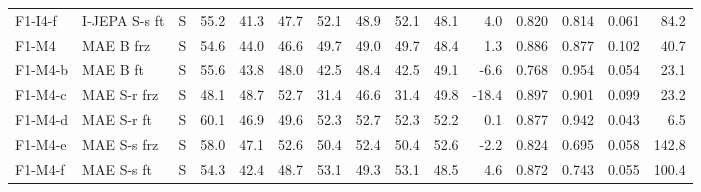 \begin{longtable}{@{}l>{\raggedright\arraybackslash}p{2.2cm}crrrrrrrrrrrr@{}}
F1-I4-f & I-JEPA S-s ft & S & 55.2 & 41.3 & 47.7 & 52.1 & 48.9 & 52.1 & 48.1 & 4.0 & 0.820 & 0.814 & 0.061 & 84.2 \\
F1-M4 & MAE B frz & S & 54.6 & 44.0 & 46.6 & 49.7 & 49.0 & 49.7 & 48.4 & 1.3 & 0.886 & 0.877 & 0.102 & 40.7 \\
F1-M4-b & MAE B ft & S & 55.6 & 43.8 & 48.0 & 42.5 & 48.4 & 42.5 & 49.1 & -6.6 & 0.768 & 0.954 & 0.054 & 23.1 \\
F1-M4-c & MAE S-r frz & S & 48.1 & 48.7 & 52.7 & 31.4 & 46.6 & 31.4 & 49.8 & -18.4 & 0.897 & 0.901 & 0.099 & 23.2 \\
F1-M4-d & MAE S-r ft & S & 60.1 & 46.9 & 49.6 & 52.3 & 52.7 & 52.3 & 52.2 & 0.1 & 0.877 & 0.942 & 0.043 & 6.5 \\
F1-M4-e & MAE S-s frz & S & 58.0 & 47.1 & 52.6 & 50.4 & 52.4 & 50.4 & 52.6 & -2.2 & 0.824 & 0.695 & 0.058 & 142.8 \\
F1-M4-f & MAE S-s ft & S & 54.3 & 42.4 & 48.7 & 53.1 & 49.3 & 53.1 & 48.5 & 4.6 & 0.872 & 0.743 & 0.055 & 100.4 \\
\end{longtable}

\endgroup
